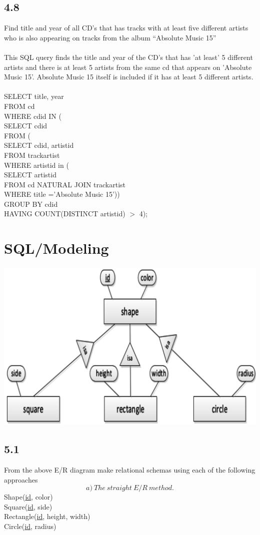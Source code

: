 \documentclass[12pt]{article}
\begin{document}
\subsection*{4.8}
Find title and year of all CD’s that has tracks with at least five different artists who is also appearing on tracks from the album “Absolute Music 15”\\
\\
This SQL query finds the title and year of the CD's that has 'at least' 5 different artists and there is at least 5 artists from the same cd that appears on 'Absolute Music 15'. Absolute Music 15 itself is included if it has at least 5 different artists.\\
\\
SELECT title, year\\
FROM cd\\
WHERE cdid IN (\\
SELECT cdid\\
FROM (\\
SELECT cdid, artistid\\
FROM trackartist\\
WHERE artistid in (\\
SELECT artistid\\
FROM cd NATURAL JOIN trackartist\\
WHERE title ='Absolute Music 15'))\\
GROUP BY cdid\\
HAVING COUNT(DISTINCT artistid) $>$ 4);

\section*{SQL/Modeling}
\includegraphics[scale=0.3]{11.PNG}
\subsection*{5.1}
From the above E/R diagram make relational schemas using each of the following approaches
$$a)\: The\:straight\:E/R\:method.$$
Shape(\underline{id}, color)\\
Square(\underline{id}, side)\\
Rectangle(\underline{id}, height, width)\\
Circle(\underline{id}, radius)
\end{document}
